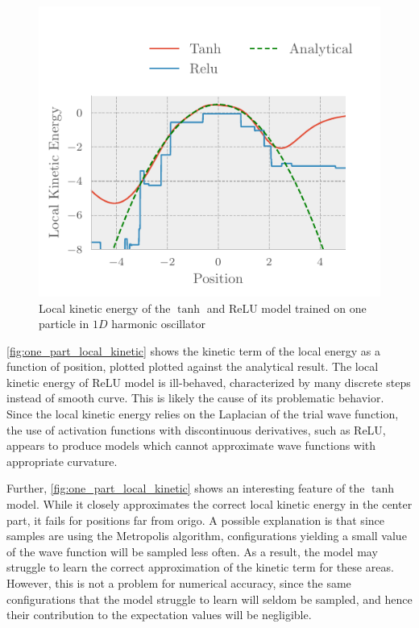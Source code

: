 \begin{figure}[H]
	\includegraphics[]{figures/one_part_local_kinetic.pdf}
	\caption{Local kinetic energy of the $\tanh$ and ReLU model trained on one particle in $1D$ harmonic oscillator}
	\label{fig:one_part_local_kinetic}
\end{figure} 

\autoref{fig:one_part_local_kinetic} shows the kinetic term of the local energy
as a function of position, plotted plotted
against the analytical result. The local kinetic energy of ReLU
model is ill-behaved, characterized by many discrete steps instead of smooth
curve. This is likely the cause of its problematic behavior. 
Since the local kinetic energy relies on the Laplacian of
the trial wave function, the use of activation functions with discontinuous
derivatives, such as ReLU, appears to produce models which cannot approximate
wave functions with appropriate curvature. 

Further, \autoref{fig:one_part_local_kinetic} shows an interesting feature of
the $\tanh$ model. While it closely approximates the correct local kinetic
energy in the center part, it fails for positions far from origo. A possible
explanation is that since samples are using the Metropolis
algorithm, configurations yielding a small value of the wave function
will be sampled less often. As a result, the model may struggle to
learn the correct approximation of the kinetic term for these areas. However,
this is not a problem for numerical accuracy, since the same configurations
that the model struggle to learn will seldom be sampled, and hence their
contribution to the expectation values will be negligible.


